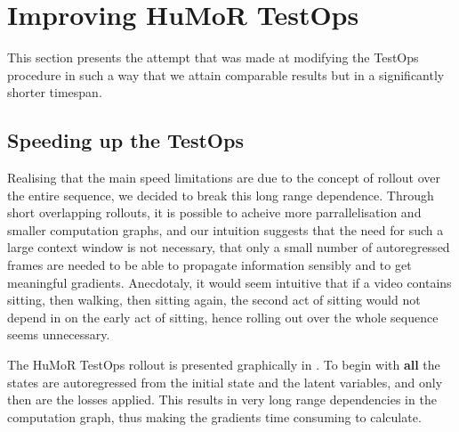 \section{Improving HuMoR TestOps}
\label{sec:humor_improvement}

This section presents the attempt that was made at modifying the TestOps procedure in such a way that we attain comparable results but in a significantly shorter timespan.

\subsection{Speeding up the TestOps}
\label{sec:humor_improvement_speed}

Realising that the main speed limitations are due to the concept of rollout over the entire sequence, we decided to break this long range dependence. Through short overlapping rollouts, it is possible to acheive more parrallelisation and smaller computation graphs, and our intuition suggests that the need for such a large context window is not necessary, that only a small number of autoregressed frames are needed to be able to propagate information sensibly and to get meaningful gradients. Anecdotaly, it would seem intuitive that if a video contains sitting, then walking, then sitting again, the second act of sitting would not depend in on the early act of sitting, hence rolling out over the whole sequence seems unnecessary.

The HuMoR TestOps rollout is presented graphically in . To begin with \textbf{all} the states are autoregressed from the initial state and the latent variables, and only then are the losses applied. This results in very long range dependencies in the computation graph, thus making the gradients time consuming to calculate. 

